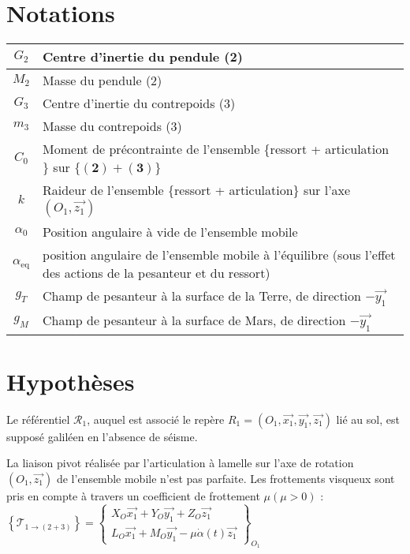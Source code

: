 \section*{Notations}
\begin{center}
\begin{tabular}{cl}
\hline
$G_{2}$ & Centre d'inertie du pendule (2) \\
\hline
$M_{2}$ & Masse du pendule (2) \\
\hline
$G_{3}$ & Centre d'inertie du contrepoids (3) \\
\hline
$m_{3}$ & Masse du contrepoids (3) \\
\hline
$C_{0}$ & Moment de précontrainte de l'ensemble \{ressort + articulation $\}$ sur $\{(\mathbf{2})+(\mathbf{3})\}$  \\
\hline
$k$ & Raideur de l'ensemble \{ressort + articulation\} sur l'axe $\left(O_{1}, \overrightarrow{z_{1}}\right)$ \\
\hline
$\alpha_{0}$ & Position angulaire à vide de l'ensemble mobile \\
\hline
$\alpha_{\mathrm{eq}}$ & position angulaire de l'ensemble mobile 
à l'équilibre (sous l'effet des actions de 
la pesanteur et du ressort) \\
\hline
$g_{T}$ & Champ de pesanteur à la surface de la 
Terre, de direction $-\overrightarrow{y_{1}}$ \\
\hline
$g_{M}$ & Champ de pesanteur à la surface de Mars, de direction $-\overrightarrow{y_{1}}$ \\
\hline
\end{tabular}
\end{center}

\section*{Hypothèses}
Le référentiel $\mathcal{R}_{1}$, auquel est associé le repère $R_{1}=\left(O_{1}, \overrightarrow{x_{1}}, \overrightarrow{y_{1}}, \overrightarrow{z_{1}}\right)$ lié au sol, est supposé galiléen en l'absence de séisme.

La liaison pivot réalisée par l'articulation à lamelle sur l'axe de rotation $\left(O_{1}, \overrightarrow{z_{1}}\right)$ de l'ensemble mobile n'est pas parfaite. Les frottements visqueux sont pris en compte à travers un coefficient de frottement $\mu(\mu>0)$ :
$
\left\{\mathcal{T}_{1 \rightarrow(2+3)}\right\}=\left\{\begin{array}{c}
X_{O} \overrightarrow{x_{1}}+Y_{O} \overrightarrow{y_{1}}+Z_{O} \overrightarrow{z_{1}} \\
L_{O} \overrightarrow{x_{1}}+M_{O} \overrightarrow{y_{1}}-\mu \dot{\alpha}(t) \overrightarrow{z_{1}}
\end{array}\right\}_{O_{1}}
$

